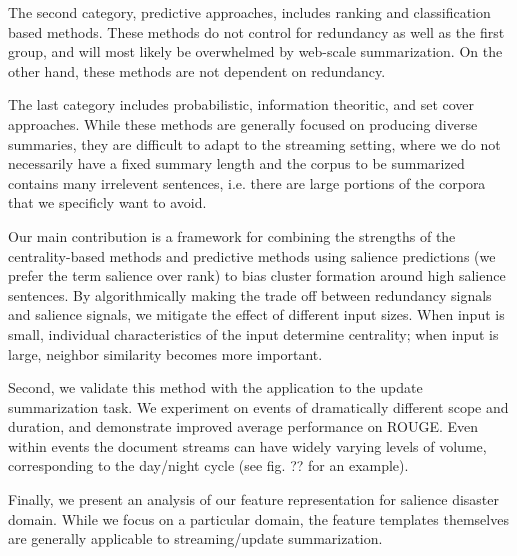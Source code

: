 The second category, predictive approaches,
includes ranking and classification based methods.
These methods do not control for redundancy as well as the first group, 
and will most likely be overwhelmed by web-scale summarization.
On the other hand, these methods are not dependent on redundancy.

The last category includes probabilistic, information theoritic, and set cover
approaches. While these methods are generally focused on producing diverse
summaries, they are difficult to adapt to the streaming setting, where 
we do not necessarily have a fixed summary length and the corpus to be
summarized contains many irrelevent sentences, i.e. there are large
portions of the corpora that we specificly want to avoid. 

Our main contribution is a framework for combining the strengths of the 
centrality-based methods and predictive methods using salience predictions (we 
prefer the term salience over rank) to bias cluster formation around high 
salience sentences.%
By algorithmically making the trade off between redundancy
signals and salience signals, we mitigate the effect of 
different input sizes. 
When input is small, individual characteristics
of the input determine centrality; when input is large, neighbor similarity 
becomes more important.

Second, we validate this method with the application to the update
summarization
task. We experiment on events of dramatically different scope and duration,
and demonstrate improved average performance on ROUGE. Even within events
the document streams can have widely varying levels of volume, corresponding
to the day/night cycle (see fig. ?? for an example).

Finally, we present an analysis of our feature representation for salience
disaster domain. While we focus on a particular domain, the feature templates
themselves are generally applicable to streaming/update summarization.


%

